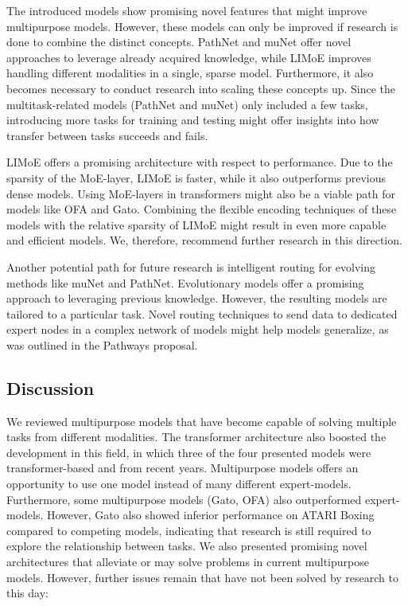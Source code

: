 \documentclass[
]{krantz}
\begin{document}
The introduced models show promising novel features that might improve multipurpose models. However, these models can only be improved if research is done to combine the distinct concepts. PathNet
and muNet offer novel approaches to leverage already acquired knowledge, while LIMoE improves handling different modalities in a single, sparse model.
Furthermore, it also becomes necessary to conduct research into scaling these concepts up. Since the multitask-related models (PathNet and muNet) only included a few tasks, introducing more tasks
for training and testing might offer insights into how transfer between tasks succeeds and fails.

LIMoE offers a promising architecture with respect to performance. Due to the sparsity of the MoE-layer, LIMoE is faster, while it also outperforms previous dense models. Using MoE-layers in
transformers might also be a viable path for models like OFA and Gato. Combining the flexible encoding techniques of these models with the relative sparsity of LIMoE might result in even more capable
and efficient models. We, therefore, recommend further research in this direction.

Another potential path for future research is intelligent routing for evolving methods like muNet and PathNet. Evolutionary models offer a promising approach to leveraging previous knowledge.
However, the resulting models are tailored to a particular task. Novel routing techniques to send data to dedicated expert nodes in a complex network of models might help models generalize,
as was outlined in the Pathways proposal.

\hypertarget{discussion-3}{%
\subsection{Discussion}\label{discussion-3}}

We reviewed multipurpose models that have become capable of solving multiple tasks from different modalities. The transformer architecture also boosted the development in this field, in which
three of the four presented models were transformer-based and from recent years. Multipurpose models offers an opportunity to use one model instead of many different expert-models. Furthermore, some
multipurpose models (Gato, OFA) also outperformed expert-models. However, Gato also showed inferior performance on ATARI Boxing compared to competing models, indicating that research is still
required to explore the relationship between tasks. We also presented promising novel architectures that alleviate or may solve problems in current multipurpose models.
However, further issues remain that have not been solved by research to this day:
\end{document}
